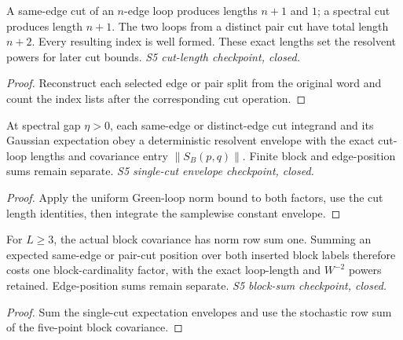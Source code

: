 \begin{lemma}
  \label{lem:loop-hierarchy-cut-lengths}
  \leanok
  A same-edge cut of an $n$-edge loop produces lengths $n+1$ and $1$;
  a spectral cut produces length $n+1$. The two loops from a distinct
  pair cut have total length $n+2$. Every resulting index is well formed.
  These exact lengths set the resolvent powers for later cut bounds.
  \emph{S5 cut-length checkpoint, closed.}
\end{lemma}
\begin{proof}\leanok
  Reconstruct each selected edge or pair split from the original word
  and count the index lists after the corresponding cut operation.
\end{proof}

\begin{lemma}
  \label{lem:loop-hierarchy-cut-norm-bounds}
  \leanok
  At spectral gap $\eta>0$, each same-edge or distinct-edge cut
  integrand and its Gaussian expectation obey a deterministic resolvent
  envelope with the exact cut-loop lengths and covariance entry
  $\|S_B(p,q)\|$. Finite block and edge-position sums remain separate.
  \emph{S5 single-cut envelope checkpoint, closed.}
\end{lemma}
\begin{proof}\leanok
  Apply the uniform Green-loop norm bound to both factors, use the cut
  length identities, then integrate the samplewise constant envelope.
\end{proof}

\begin{lemma}
  \label{lem:loop-hierarchy-cut-block-sum}
  \leanok
  For $L\geq3$, the actual block covariance has norm row sum one.
  Summing an expected same-edge or pair-cut position over both inserted
  block labels therefore costs one block-cardinality factor, with the
  exact loop-length and $W^{-2}$ powers retained. Edge-position sums
  remain separate. \emph{S5 block-sum checkpoint, closed.}
\end{lemma}
\begin{proof}\leanok
  Sum the single-cut expectation envelopes and use the stochastic row
  sum of the five-point block covariance.
\end{proof}

